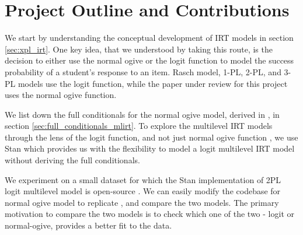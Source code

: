 \documentclass[12pt]{article}
\begin{document}
    
    
    
    

\section{Project Outline and Contributions}
We start by understanding the conceptual development of IRT models in section \ref{sec:xpl_irt}. One key idea, that we understood by taking this route, is the decision to either use the normal ogive or the logit function to model the success probability of a student's response to an item. Rasch model, 1-PL, 2-PL, and 3-PL models use the logit function, while the paper under review for this project \cite{fox2001bayesian} uses the normal ogive function.

We list down the full conditionals for the normal ogive model, derived in \cite{fox2001bayesian}, in section \ref{sec:full_conditionals_mlirt}. To explore the multilevel IRT models through the lens of the logit function, and not just normal ogive function \cite{fox2001bayesian}, we use Stan which provides us with the flexibility to model a logit multilevel IRT model without deriving the full conditionals.

We experiment on a small dataset \cite{thissen1993detection} for which the Stan implementation of 2PL logit multilevel model is open-source \cite{furr2016two}. We can easily modify the codebase for normal ogive model to replicate \cite{fox2001bayesian}, and compare the two models. The primary motivation to compare the two models is to check which one of the two - logit or normal-ogive, provides a better fit to the data.
\end{document}
